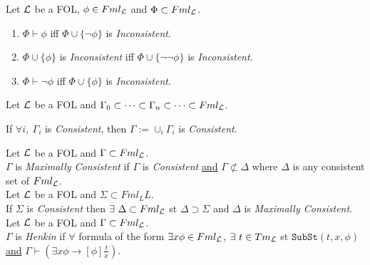 \documentclass[11pt,a4paper]{article}
\begin{document}



Let $\mathcal{L}$ be a FOL, $\phi\in Fml_{\mathcal{L}}$ and $\Phi\subset Fml_{\mathcal{L}}$.
\begin{enumerate}
	\item $\Phi\vdash\phi$ iff $\Phi\cup\{\neg\phi\}$ is \textit{Inconsistent}.
	\item $\Phi\cup\{\phi\}$ is \textit{Inconsistent} iff $\Phi\cup\{\neg\neg\phi\}$ is \textit{Inconsistent}.
	\item $\Phi\vdash\neg\phi$ iff $\Phi\cup\{\phi\}$ is \textit{Inconsistent}.
\end{enumerate}


Let $\mathcal{L}$ be a FOL and $\Gamma_0\subset\dots\subset\Gamma_n\subset\dots\subset Fml_{\mathcal{L}}$.
\begin{center}
If $\forall i,\ \Gamma_i$ is \textit{Consistent}, then $\Gamma:=\cup_i\Gamma_i$ is \textit{Consistent}.
\end{center}

Let $\mathcal{L}$ be a FOL and $\Gamma\subset Fml_{\mathcal{L}}$.\\
$\Gamma$ is \textit{Maximally Consistent} if $\Gamma$ is \textit{Consistent} \underline{and} $\Gamma\not\subset\Delta$ where $\Delta$ is any consistent set of $Fml_{\mathcal{L}}$.\\

\proposition{}
Let $\mathcal{L}$ be a FOL and $\Sigma\subset Fml_LL$.\\
If $\Sigma$ is \textit{Consistent} then $\exists\ \Delta\subset Fml_\LL$ st $\Delta\supset\Sigma$ and $\Delta$ is \textit{Maximally Consistent}.\\

Let $\mathcal{L}$ be a FOL and $\Gamma\subset Fml_{\mathcal{L}}$.\\
$\Gamma$ is \textit{Henkin} if $\forall$ formula of the form $\exists x\phi\in Fml_{\mathcal{L}}$, $\exists\ t\in Tm_{\mathcal{L}}$ st $\mathtt{SubSt}(t,x,\phi)$ \underline{and} ${\Gamma\vdash(\exists x\phi\to[\phi]\frac{t}x)}$.\\
\end{document}
